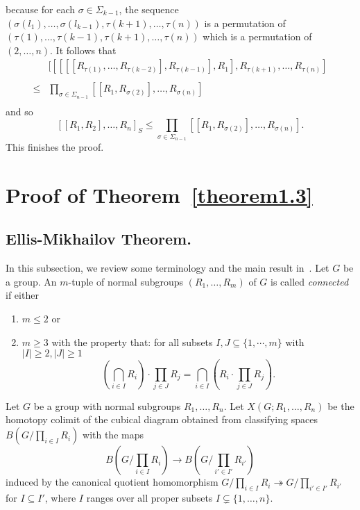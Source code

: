 \documentclass[10pt]{amsart}
\numberwithin{equation}{section}
\begin{document}
because for each $\sigma\in \Sigma_{k-1}$, the sequence $(\sigma(l_1),\ldots,\sigma(l_{k-1}),\tau(k+1),\ldots,\tau(n))$ is a permutation of $(\tau(1),\ldots,\tau(k-1),\tau(k+1),\ldots,\tau(n))$ which is a permutation of $(2,\ldots,n)$.
 It follows that
 $$
 \begin{array}{rl}
 &[[[[[R_{\tau(1)},\ldots,R_{\tau(k-2)}],R_{\tau(k-1)}],R_1],R_{\tau(k+1)},\ldots,R_{\tau(n)}]\\
&\\
 \leq &\prod\limits_{\sigma\in \Sigma_{n-1}}[[R_{1},R_{\sigma(2)}],\ldots,R_{\sigma(n)}]\\
 \end{array}
 $$
and so $$[[R_1,R_2],\ldots,R_n]_S\leq \prod_{\sigma\in \Sigma_{n-1}}[[R_{1},R_{\sigma(2)}],\ldots,R_{\sigma(n)}].$$ This finishes the proof.

\section{Proof of Theorem~\ref{theorem1.3}}\label{section3}
\subsection{Ellis-Mikhailov Theorem.}
In this subsection, we review some terminology and the main result in~\cite{EM}. Let $G$ be a group. An $m$-tuple of normal subgroups $(R_1,\ldots,R_m)$ of $G$ is called \textit{connected} if either
\begin{enumerate}
\item  $m\leq 2$ or
\item $m\geq 3$ with the property that: for all subsets $I, J \subseteq \{1,\cdots,m\}$ with $ |I|\geq 2,
|J|\geq 1$
\begin{equation}\label{connectivity}
\left(\bigcap_{i\in I} R_i \right)\cdot  \prod_{j\in J}R_j =
\bigcap_{i\in I} \left( R_i\cdot \prod_{j\in J}R_j \right).
\end{equation}
\end{enumerate}

Let  $G$  be a group with normal subgroups $R_1,\ldots,R_n$. Let $X(G;R_1,\ldots,R_n)$ be the homotopy colimit of the cubical diagram obtained from  classifying spaces $B(G/\prod_{i\in I} R_i)$ with the maps
$$
B(G/\prod_{i\in I} R_i)\to B(G/\prod_{i'\in I'}R_{i'})
$$
induced by the canonical quotient homomorphism $G/\prod_{i\in I} R_i \twoheadrightarrow G/\prod_{i'\in I'}R_{i'}$ for $I\subseteq I'$, where $I$ ranges over all proper subsets $I \subsetneq \{1,\ldots,n\}$.
\end{document}

